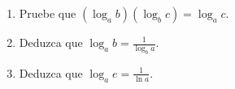 \item 
\begin{enumerate}
    \item[(a)] Pruebe que $(\log_a b)(\log_b c) = \log_a c$.
    \item[(b)] Deduzca que $\displaystyle \log_a b = \frac{1}{\log_b a}$.
    \item[(c)] Deduzca que $\displaystyle \log_a e = \frac{1}{\ln a}$.
\end{enumerate}
